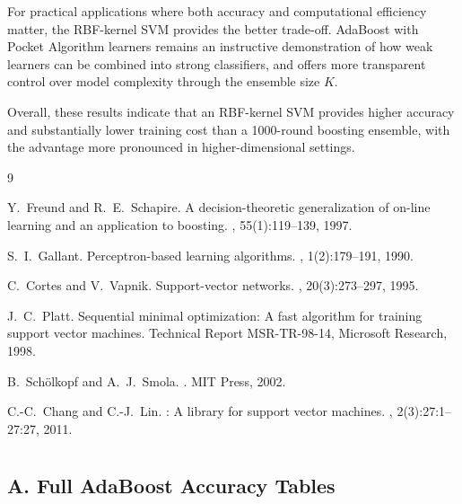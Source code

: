 \documentclass{acm_proc_article-sp}
\begin{document}
For practical applications where both accuracy and computational efficiency matter, the RBF-kernel SVM provides the better trade-off. AdaBoost with Pocket Algorithm learners remains an instructive demonstration of how weak learners can be combined into strong classifiers, and offers more transparent control over model complexity through the ensemble size $K$.

Overall, these results indicate that an RBF-kernel SVM provides higher accuracy and substantially lower training cost than a 1000-round boosting ensemble, with the advantage more pronounced in higher-dimensional settings.

\begin{thebibliography}{9}

Y.~Freund and R.~E.~Schapire.
\newblock A decision-theoretic generalization of on-line learning and an application to boosting.
, 55(1):119--139, 1997.

S.~I.~Gallant.
\newblock Perceptron-based learning algorithms.
, 1(2):179--191, 1990.

C.~Cortes and V.~Vapnik.
\newblock Support-vector networks.
, 20(3):273--297, 1995.

J.~C.~Platt.
\newblock Sequential minimal optimization: A fast algorithm for training support vector machines.
\newblock Technical Report MSR-TR-98-14, Microsoft Research, 1998.

B.~Sch\"{o}lkopf and A.~J.~Smola.
.
\newblock MIT Press, 2002.

C.-C.~Chang and C.-J.~Lin.
: A library for support vector machines.
, 2(3):27:1--27:27, 2011.

\end{thebibliography}
\newpage
\appendix

\section*{}
\subsection*{A. Full AdaBoost Accuracy Tables}
\end{document}
